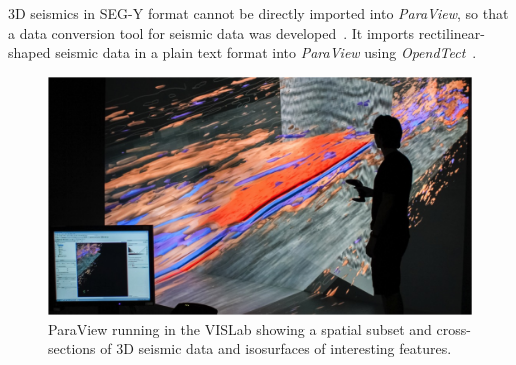 \documentclass[twocolumn]{svjour3}          %
\begin{document}
3D seismics in SEG-Y format cannot be directly imported into \emph{ParaView}, so that a data conversion tool for seismic data was developed~\cite{bilke:simpleseismicreader}. It imports rectilinear-shaped seismic data in a plain text format into \emph{ParaView} using \emph{OpendTect}~\cite{web:opendtect}.

\begin{figure}[htb]
  \includegraphics[width=\linewidth]{images/seismic.jpg}
\caption{ParaView running in the VISLab showing a spatial subset and cross-sections of 3D seismic data and isosurfaces of interesting features.}
\label{fig:seismic}
\end{figure}

\end{document}
